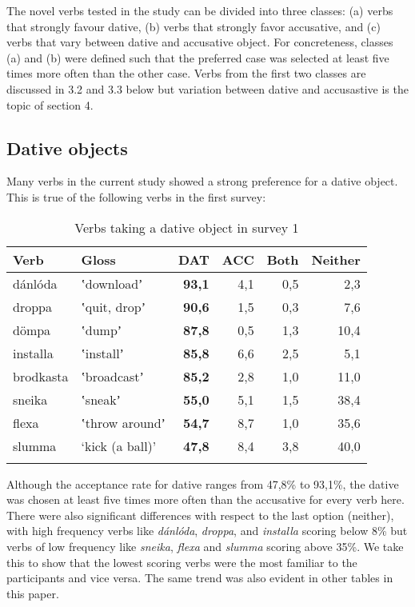 \documentclass[output=paper,modfonts,nonflat,colorlinks,citecolor=brown]{langsci/langscibook}
\begin{document}
The novel verbs tested in the study can be divided into three classes: (a) verbs that strongly favour dative, (b) verbs that strongly favor accusative, and (c) verbs that vary between dative and accusative object. For concreteness, classes (a) and (b) were defined such that the preferred case was selected at least five times more often than the other case. Verbs from the first two classes are discussed in 3.2 and 3.3 below but variation between dative and accusastive is the topic of section 4.

\subsection{Dative objects} %

Many verbs in the current study showed a strong preference for a dative object. This is true of the following verbs in the first survey: 

\begin{table}
\caption{\label{tab:jonsson:1}Verbs taking a dative object in survey 1}
\begin{tabularx}{\textwidth}{XXrrrr}
\lsptoprule
Verb & Gloss & \textbf{DAT} & ACC & Both & Neither\\
\midrule
dánlóda & ʽdownloadʼ & \textbf{93,1} & 4,1 & 0,5 & 2,3\\
droppa & ʽquit, dropʼ & \textbf{90,6} & 1,5 & 0,3 & 7,6\\
dömpa & ʽdumpʼ & \textbf{87,8} & 0,5 & 1,3 & 10,4\\
installa & ʽinstallʼ & \textbf{85,8} & 6,6 & 2,5 & 5,1\\
brodkasta & ʽbroadcastʼ & \textbf{85,2} & 2,8 & 1,0 & 11,0\\
sneika & ʽsneakʼ & \textbf{55,0} & 5,1 & 1,5 & 38,4\\
flexa & ʽthrow aroundʼ & \textbf{54,7} & 8,7 & 1,0 & 35,6\\
slumma & ‘kick (a ball)’ & \textbf{47,8} & 8,4 & 3,8 & 40,0\\
\lspbottomrule
\end{tabularx}
\end{table}

Although the acceptance rate for dative ranges from 47,8\% to 93,1\%, the dative was chosen at least five times more often than the accusative for every verb here. There were also significant differences with respect to the last option (neither), with high frequency verbs like \textit{dánlóda}, \textit{droppa}, and \textit{installa} scoring below 8\% but verbs of low frequency like \textit{sneika}, \textit{flexa} and \textit{slumma} scoring above 35\%. We take this to show that the lowest scoring verbs were the most familiar to the participants and vice versa. The same trend was also evident in other tables in this paper.
\end{document}
